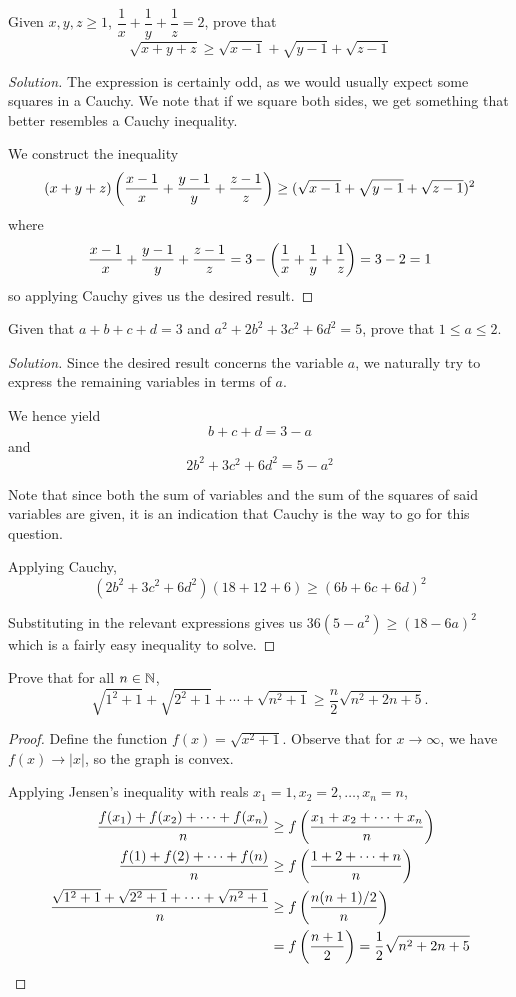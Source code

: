 \begin{prbm}
Given $x,y,z\ge 1$, $\dfrac{1}{x}+\dfrac{1}{y}+\dfrac{1}{z}=2$, prove that
\[ \sqrt{x+y+z} \ge \sqrt{x-1} + \sqrt{y-1} + \sqrt{z-1} \]
\end{prbm}

\begin{proof}[Solution]
The expression is certainly odd, as we would usually expect some squares in a Cauchy. We note that if we square both sides, we get something that better resembles a Cauchy inequality.

We construct the inequality 
\[ (x+y+z)\left(\frac{x-1}{x}+\frac{y-1}{y}+\frac{z-1}{z}\right) \ge (\sqrt{x-1}+\sqrt{y-1}+\sqrt{z-1})^2 \]
where
\[ \frac{x-1}{x}+\frac{y-1}{y}+\frac{z-1}{z} = 3 - \left(\frac{1}{x}+\frac{1}{y}+\frac{1}{z}\right) = 3-2=1 \]
so applying Cauchy gives us the desired result.
\end{proof}
\pagebreak

\begin{prbm}
Given that $a+b+c+d=3$ and $a^2+2b^2+3c^2+6d^2=5$, prove that $1\le a\le 2$.
\end{prbm}

\begin{proof}[Solution]
Since the desired result concerns the variable $a$, we naturally try to express the remaining variables in terms of $a$. 

We hence yield
\[ b+c+d=3-a \]
and
\[ 2b^2+3c^2+6d^2=5-a^2 \]

Note that since both the sum of variables and the sum of the squares of said variables are given, it is an indication that Cauchy is the way to go for this question.

Applying Cauchy,
\[ (2b^2+3c^2+6d^2)(18+12+6) \ge (6b+6c+6d)^2 \]

Substituting in the relevant expressions gives us $36(5-a^2)\ge (18-6a)^2$ which is a fairly easy inequality to solve.
\end{proof}
\pagebreak

\begin{prbm}
Prove that for all $n \in \mathbb N$,
\[ \sqrt{1^2+1}+\sqrt{2^2+1}+\cdots+\sqrt{n^2+1}\ge\frac{n}{2}\sqrt{n^2+2n+5}. \]
\end{prbm}

\begin{proof}
Define the function $f(x)=\sqrt{x^2+1}$. Observe that for $x\to\infty$, we have $f(x)\to|x|$, so the graph is convex.

Applying Jensen's inequality with reals $x_1=1,x_2=2,\dots,x_n=n$,
\begin{align*}
\frac{f(x_1)+f(x_2)+\cdots+f(x_n)}{n} &\ge f\left(\frac{x_1+x_2+\cdots+x_n}{n}\right) \\
\frac{f(1)+f(2)+\cdots+f(n)}{n} &\ge f\left(\frac{1+2+\cdots+n}{n}\right) \\
\frac{\sqrt{1^2+1}+\sqrt{2^2+1}+\cdots+\sqrt{n^2+1}}{n} &\ge f\left(\frac{n(n+1)/2}{n}\right)\\&= f\left(\frac{n+1}{2}\right)=\frac{1}{2}\sqrt{n^2+2n+5}
\end{align*}
\end{proof}
\pagebreak

